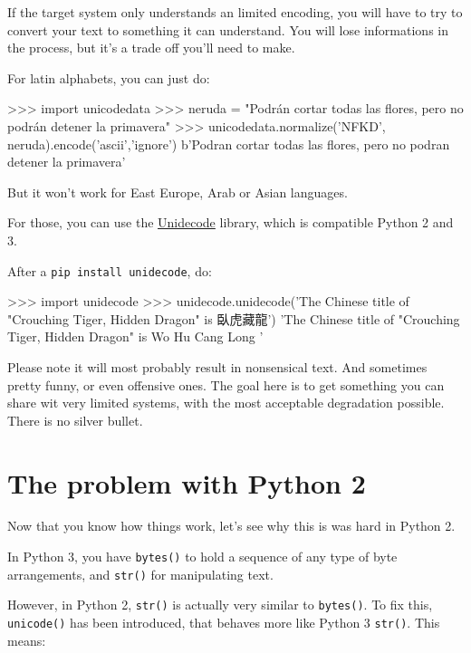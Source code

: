 If the target system only understands an limited encoding, you will have to try to convert your text to something it can understand. You will lose informations in the process, but it's a trade off you'll need to make.

For latin alphabets, you can just do:

\begin{py3}
>>> import unicodedata
>>> neruda = "Podrán cortar todas las flores, pero no podrán detener la primavera"
>>> unicodedata.normalize('NFKD', neruda).encode('ascii','ignore')
b'Podran cortar todas las flores, pero no podran detener la primavera'
\end{py3}

But it won't work for East Europe, Arab or Asian languages.

For those, you can use the \href{https://pypi.org/project/Unidecode/}{Unidecode} library, which is compatible Python 2 and 3.

After a \lstinline{pip install unidecode}, do:

\begin{py3}
>>> import unidecode
>>> unidecode.unidecode('The Chinese title of "Crouching Tiger, Hidden Dragon" is 臥虎藏龍')
'The Chinese title of "Crouching Tiger, Hidden Dragon" is Wo Hu Cang Long '
\end{py3}

Please note it will most probably result in nonsensical text. And sometimes pretty funny, or even offensive ones. The goal here is to get something you can share wit very limited systems, with the most acceptable degradation possible. There is no silver bullet.

\section{The problem with Python 2}

Now that you know how things work, let's see why this is was hard in Python 2.

In Python 3, you have \lstinline{bytes()} to hold a sequence of any type of byte arrangements, and \lstinline{str()} for manipulating text.

However, in Python 2, \lstinline{str()} is actually very similar to \lstinline{bytes()}. To fix this, \lstinline{unicode()} has been introduced, that behaves more like Python 3 \lstinline{str()}. This means:

